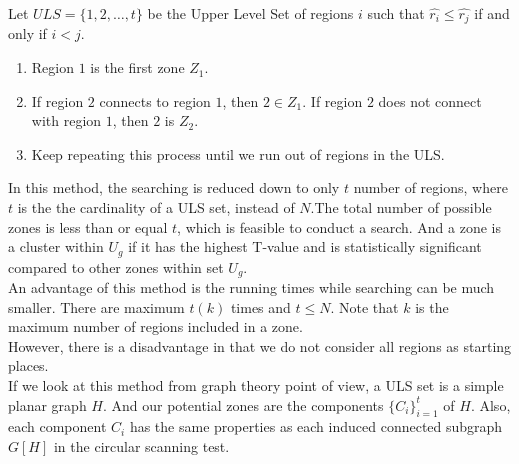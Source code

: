 \documentclass[12pt]{article}
\begin{document}
\begin{enumerate}
				Let $ULS= \{1,2,\dots,t\}$ be the Upper Level Set of regions $i$ such that $\hat{r_i} \leq \hat{r_j}$ if and only if $i < j$.  
				\begin{enumerate}
					\item Region $1$ is the first zone $Z_1$. 
					\item If region $2$ connects to region $1$, then $2 \in Z_1$. If region $2$ does not connect with region $1$, then $2$ is $Z_2$. 
					\item Keep repeating this process until we run out of regions in the ULS. \\   
				\end{enumerate}
			 In this method, the searching is reduced down to only $t$ number of regions, where $t$ is the the cardinality of a ULS set, instead of $N$.The total number of possible zones is less than or equal $t$, which is feasible to conduct a search. And a zone is a cluster within $U_g$ if it has the highest T-value and is statistically significant compared to other zones within set $U_g$.\\ 
		An advantage of this method is the running times while searching can be much smaller. There are maximum $t(k)$ times and $t \leq N$. Note that $k$ is the maximum number of regions included in a zone. \\	
		However, there is a disadvantage in that we do not consider all regions as starting places.\\
		
		If we look at this method from graph theory point of view, a ULS set is a simple planar graph $H$. And our potential zones are the components $\{C_i\}_{i=1}^{t}$ of $H$. Also, each component $C_i$ has the same properties as each induced connected subgraph $G[H]$ in the circular scanning test. \\  
				

\end{enumerate}
\end{document}
